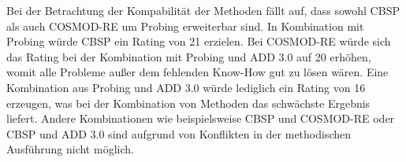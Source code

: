 Bei der Betrachtung der Kompabilität der Methoden fällt auf, dass sowohl CBSP als auch COSMOD-RE um Probing erweiterbar sind. In Kombination mit Probing würde CBSP ein Rating von 21 erzielen. Bei COSMOD-RE würde sich das Rating bei der Kombination mit Probing und ADD 3.0 auf 20 erhöhen, womit alle Probleme außer dem fehlenden Know-How gut zu lösen wären. Eine Kombination aus Probing und ADD 3.0 würde lediglich ein Rating von 16 erzeugen, was bei der Kombination von Methoden das schwächste Ergebnis liefert. Andere Kombinationen wie beispielsweise CBSP und COSMOD-RE oder CBSP und ADD 3.0 sind aufgrund von Konflikten in der methodischen Ausführung nicht möglich. \\
